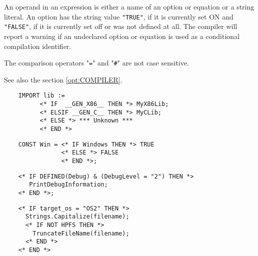 An operand in an expression is either a name of an option or equation or
a string literal. An option has the string value \verb'"TRUE"', if it is
currently set ON and \verb'"FALSE"', if it is currently set off
or was not defined at all. The compiler will report a warning if an
undeclared option or equation is used as a conditional compilation identifier.

The comparison operators "\verb'='" and "\verb'#'" are not case sensitive.

See also the section \ref{opt:COMPILER}.

\Examples
\begin{verbatim}
    IMPORT lib :=
          <* IF  __GEN_X86__ THEN *> MyX86Lib;
          <* ELSIF __GEN_C__ THEN *> MyCLib;
          <* ELSE *> *** Unknown ***
          <* END *>
\end{verbatim}

\begin{verbatim}
    CONST Win = <* IF Windows THEN *> TRUE
                <* ELSE *> FALSE
                <* END *>;
\end{verbatim}

\begin{verbatim}
    <* IF DEFINED(Debug) & (DebugLevel = "2") THEN *>
       PrintDebugInformation;
    <* END *>;
\end{verbatim}

\begin{verbatim}
    <* IF target_os = "OS2" THEN *>
      Strings.Capitalize(filename);
      <* IF NOT HPFS THEN *>
        TruncateFileName(filename);
      <* END *>
    <* END *>
\end{verbatim}

